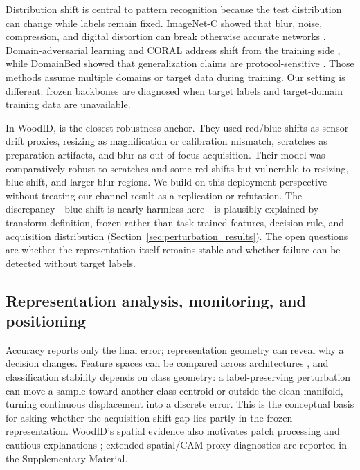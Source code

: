 \documentclass[a4paper,fleqn]{els-cas-templates/cas-sc}
\begin{document}
Distribution shift is central to pattern recognition because the test
distribution can change while labels remain fixed. ImageNet-C showed that blur,
noise, compression, and digital distortion can break otherwise accurate networks
\citep{hendrycks2019corruptions}. Domain-adversarial learning and CORAL address
shift from the training side \citep{ganin2016domain,sun2016coral}, while
DomainBed showed that generalization claims are protocol-sensitive
\citep{gulrajani2021domainbed}. Those methods assume multiple domains or target
data during training. Our setting is different: frozen backbones are diagnosed
when target labels and target-domain training data are unavailable.

In WoodID, \citet{owens2025robustness} is the closest robustness anchor. They
used red/blue shifts as sensor-drift proxies, resizing as magnification or
calibration mismatch, scratches as preparation artifacts, and blur as
out-of-focus acquisition. Their model was comparatively robust to scratches and
some red shifts but vulnerable to resizing, blue shift, and larger blur regions.
We build on this deployment perspective without treating our channel result as a
replication or refutation. The discrepancy---blue shift is nearly harmless
here---is plausibly explained by transform definition, frozen rather than
task-trained features, decision rule, and acquisition distribution
(Section~\ref{sec:perturbation_results}). The open questions are whether the
representation itself remains stable and whether failure can be detected without
target labels.

\subsection{Representation analysis, monitoring, and positioning}

Accuracy reports only the final error; representation geometry can reveal why a
decision changes. Feature spaces can be compared across architectures
\citep{kornblith2019representations}, and classification stability depends on
class geometry: a label-preserving perturbation can move a sample toward another
class centroid or outside the clean manifold, turning continuous displacement
into a discrete error. This is the conceptual basis for asking whether the
acquisition-shift gap lies partly in the frozen representation. WoodID's spatial
evidence also motivates patch processing and cautious explanations
\citep{selvaraju2020gradcam,bai2021explainable}; extended spatial/CAM-proxy
diagnostics are reported in the Supplementary Material.
\end{document}
